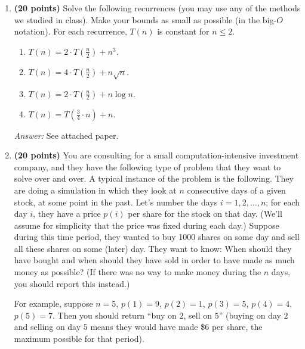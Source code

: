 \documentclass[11pt]{article}
\begin{document}
\begin{enumerate}
\begin{enumerate}
Sorting $B$ is $O(m\log m)$. Performing a binary search on $B$ for every element in $A$ is $O(n\log m)$. Finding a given solution
from $C$ is at worst $O(m)$. Therefore this algorithm is $m\log m + n\log m + m = O(n\log m)$.
\end{enumerate}


{\bf Note:}
You will receive the full 30 points if you give an $O(n\log m)$ time algorithm directly for (c) without giving any algorithms for (a) or (b).


\item
{\bf (20 points)}
Solve the following recurrences (you may use any of the methods we studied in class). Make your bounds as small as possible (in the big-$O$ notation). For each recurrence, $T(n)$ is constant for $n\leq 2$.

\begin{enumerate}

\item
$T(n)=2\cdot T(\frac{n}{2})+ n^3$.

\item
$T(n)=4\cdot T(\frac{n}{2})+n\sqrt{n}$.

\item
$T(n)=2\cdot T(\frac{n}{2})+n\log n$.

\item
$T(n)=T(\frac{3}{4}\cdot n)+n$.
\end{enumerate}

\textit{Answer:} See attached paper.

\item
 {\bf (20 points)}
You are consulting for a small computation-intensive investment company, and
they have the following type of problem that they want to solve over and over.
A typical instance of the problem is the following. They are doing a simulation
in which they look at $n$ consecutive days of a given stock, at some point in the past.
Let's number the days $i=1,2,\ldots,n$; for each day $i$, they have a price $p(i)$ per share for the stock on that day. (We'll assume for simplicity that the price was fixed during each day.) Suppose during this time period, they wanted to buy 1000 shares on some day and sell all these shares on some (later) day. They want to know: When should they have bought and when should they have sold in order to have made as much money as possible? (If there was no way to make money during the $n$ days, you should report this instead.)

For example, suppose $n=5$, $p(1)=9$, $p(2)=1$, $p(3)=5$, $p(4)=4$, $p(5)=7$. Then you should return ``buy on $2$, sell on $5$'' (buying on day $2$ and selling on day $5$ means they would have made \$6 per share, the maximum possible for that period).


\end{enumerate}
\end{document}
